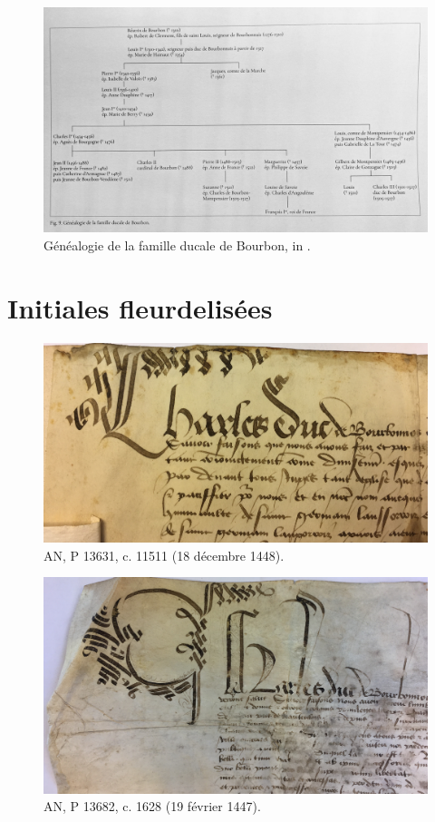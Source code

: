 \begin{figure}[H]
\centering
\includegraphics[scale =0.22]{front/images/genealogie.jpeg}
\caption*{Généalogie de la famille ducale de Bourbon, in \cite{matteoniBourbonsLeurBibliotheque2022}.}
\label{genealogie}
\end{figure}
\newpage 

\section*{Initiales fleurdelisées}

 \begin{figure}[H]
\centering
\includegraphics[scale =0.09]{front/images/fleurlys1.jpg}
\caption*{AN, P 13631, c. 11511 (18 décembre 1448).}
\label{fl1}
\end{figure}

\begin{figure}[H]
\centering
\includegraphics[scale =0.09]{front/images/fleurlys2.jpg}
\caption*{AN, P 13682, c. 1628 (19 février 1447).}
\label{fl2}
\end{figure}
\newpage 

